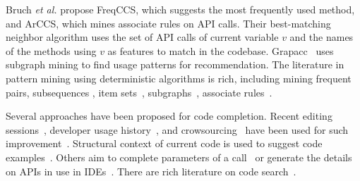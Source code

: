 
\vspace{0.04in}
  Bruch {\em et al.}
\cite{bruch-fse09} propose FreqCCS, which suggests the most frequently used method, and
ArCCS, which mines associate rules on API calls. Their best-matching
neighbor algorithm uses the set of API calls of current variable
$v$ and the names of the methods using $v$ as features to match in
the codebase.
Grapacc~\cite{icse12-grapacc} uses subgraph mining to find
usage patterns for recommendation.
%
The literature in pattern mining using deterministic
algorithms is rich, including mining frequent
pairs, subsequences \cite{zeller07,mapo-fse07,mapo-ecoop09}, item
sets~\cite{bruch-fse09}, subgraphs~\cite{neglected}, associate
rules~\cite{davidlo-ase08}.


Several approaches have been proposed for code completion. Recent
editing sessions~\cite{robbes08}, developer usage
history~\cite{mylyn06}, and crowsourcing~\cite{mira14} have been used
for such improvement~\cite{hou-icsm11,denys-rsse10}.
Structural context of current code is used to suggest code
examples~\cite{strathcona05,hill04}. Others aim to complete parameters
of a call~\cite{zhang-icse12} or generate the details on APIs in use
in IDEs~\cite{omar12}. There are rich literature on code
search~\cite{reiss-icse09,stolee12,reid-icse14,weimer-icse12}.

